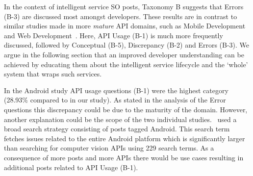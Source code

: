 
In the context of intelligent service SO posts, Taxonomy B suggests that Errors (B-3) are discussed most amongst developers. These results are in contrast to similar studies made in more \textit{mature} API domains, such as Mobile Development~\citep{Beyer:2018fm,Beyer:2014ec,Rosen:2016uk, Barnett:2015ec, Barnett:2015ut} and Web Development~\citep{Treude:2011fh}. Here, API Usage (B-1) is much more frequently discussed, followed by Conceptual (B-5), Discrepancy (B-2) and Errors (B-3). We argue in the following section that an improved developer understanding can be achieved by educating them about the intelligent service lifecycle and the `whole' system that wraps such services. 

In the Android study API usage questions (B-1) were the highest category (28.93\% compared to \PctTaxBAPIUsage{} in our study). As stated in the analysis of the Error questions this discrepancy could be due to the maturity of the domain. However, another explanation could be the scope of the two individual studies.~\citet{Beyer:2018fm} used a broad search strategy consisting of posts tagged Android. This search term fetches issues related to the entire Android platform which is significantly larger than searching for computer vision APIs using 229 search terms. As a consequence of more posts and more APIs there would be use cases resulting in additional posts related to API Usage (B-1). 

